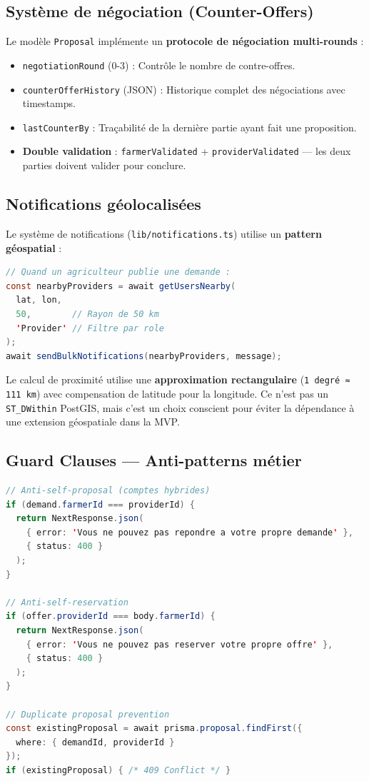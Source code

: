 \documentclass[12pt, a4paper]{article}
\begin{document}
\subsection{Système de négociation (Counter-Offers)}

Le modèle \texttt{Proposal} implémente un \textbf{protocole de négociation multi-rounds} :

\begin{itemize}[leftmargin=2em]
  \item \texttt{negotiationRound} (0-3) : Contrôle le nombre de contre-offres.
  \item \texttt{counterOfferHistory} (JSON) : Historique complet des négociations avec timestamps.
  \item \texttt{lastCounterBy} : Traçabilité de la dernière partie ayant fait une proposition.
  \item \textbf{Double validation} : \texttt{farmerValidated} + \texttt{providerValidated} — les deux parties doivent valider pour conclure.
\end{itemize}

\subsection{Notifications géolocalisées}

Le système de notifications (\texttt{lib/notifications.ts}) utilise un \textbf{pattern géospatial} :

\begin{lstlisting}[language=Java, caption=Notification de proximite]
// Quand un agriculteur publie une demande :
const nearbyProviders = await getUsersNearby(
  lat, lon,
  50,        // Rayon de 50 km
  'Provider' // Filtre par role
);
await sendBulkNotifications(nearbyProviders, message);
\end{lstlisting}

Le calcul de proximité utilise une \textbf{approximation rectangulaire} (\texttt{1 degré ≈ 111 km}) avec compensation de latitude pour la longitude. Ce n'est pas un \texttt{ST\_DWithin} PostGIS, mais c'est un choix conscient pour éviter la dépendance à une extension géospatiale dans la MVP.

\subsection{Guard Clauses — Anti-patterns métier}

\begin{lstlisting}[language=Java, caption=Protections metier dans les API Routes]
// Anti-self-proposal (comptes hybrides)
if (demand.farmerId === providerId) {
  return NextResponse.json(
    { error: 'Vous ne pouvez pas repondre a votre propre demande' },
    { status: 400 }
  );
}

// Anti-self-reservation
if (offer.providerId === body.farmerId) {
  return NextResponse.json(
    { error: 'Vous ne pouvez pas reserver votre propre offre' },
    { status: 400 }
  );
}

// Duplicate proposal prevention
const existingProposal = await prisma.proposal.findFirst({
  where: { demandId, providerId }
});
if (existingProposal) { /* 409 Conflict */ }
\end{lstlisting}
\end{document}
